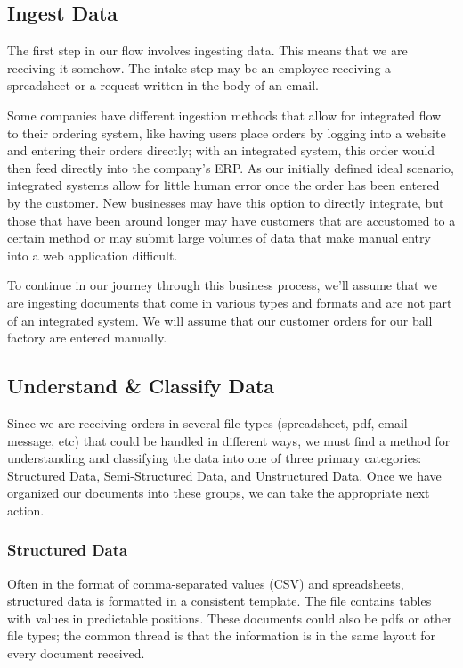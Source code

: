 \documentclass[conference]{IEEEtran}
\begin{document}
\subsection{Ingest Data}
The first step in our flow involves ingesting data. This means that we are receiving it somehow. The intake step may be an employee receiving a spreadsheet or a request written in the body of an email.

Some companies have different ingestion methods that allow for integrated flow to their ordering system, like having users place orders by logging into a website and entering their orders directly; with an integrated system, this order would then feed directly into the company's ERP. As our initially defined ideal scenario, integrated systems allow for little human error once the order has been entered by the customer. New businesses may have this option to directly integrate, but those that have been around longer may have customers that are accustomed to a certain method or may submit large volumes of data that make manual entry into a web application difficult.

To continue in our journey through this business process, we'll assume that we are ingesting documents that come in various types and formats and are not part of an integrated system. We will assume that our customer orders for our ball factory are entered manually.

\subsection{Understand \& Classify Data}
Since we are receiving orders in several file types (spreadsheet, pdf, email message, etc) that could be handled in different ways, we must find a method for understanding and classifying the data into one of three primary categories: Structured Data, Semi-Structured Data, and Unstructured Data. Once we have organized our documents into these groups, we can take the appropriate next action.

\subsubsection{Structured Data}
Often in the format of comma-separated values (CSV) and spreadsheets, structured data is formatted in a consistent template. The file contains tables with values in predictable positions. These documents could also be pdfs or other file types; the common thread is that the information is in the same layout for every document received.
\end{document}

